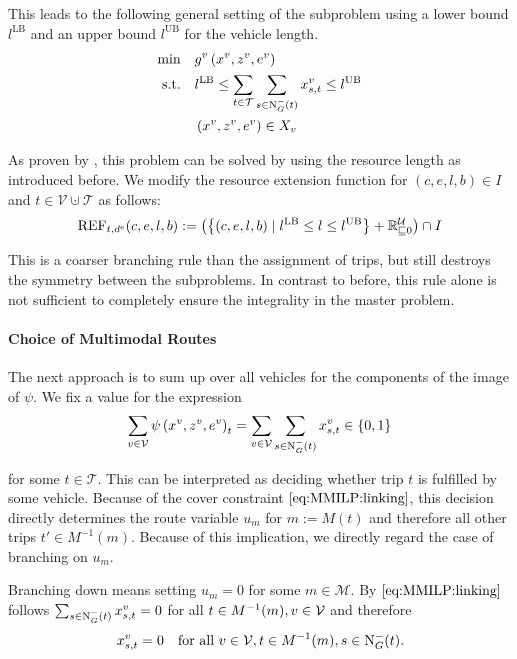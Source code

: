 This leads to the following general setting of the subproblem using a lower bound $l^{\operatorname{LB}}$ and an upper bound $l^{\operatorname{UB}}$ for the vehicle length.
\begin{align}
	\min \quad & g^v\left(x^v,z^v,e^v\right) \nonumber \\
	\text{s.t.} \quad & l^{\operatorname{LB}} \leq \sum_{t\in\mathcal{T}} \sum_{s\in\operatorname{N}_G^-(t)} x^v_{s,t} \leq l^{\operatorname{UB}} \label{eq:SPv:duty_length} \\
	& \left(x^v,z^v,e^v\right)\in X_v \nonumber
\end{align}

As proven by \cite{Kaiser}, this problem can be solved by using the resource length as introduced before. We modify the resource extension function for $(c,e,l,b)\in I$ and ${t\in\mathcal{V}\cupdot\mathcal{T}}$ as follows:
\begin{align*}
	\operatorname{REF}_{t,d^{\operatorname{e}}}(c,e,l,b) := \left(\left\{(c,e,l,b)\mid l^{\operatorname{LB}}\leq l \leq l^{\operatorname{UB}}\right\} + \mathbb{R}^{\mathcal{U}}_{\sqsubseteq 0}\right) \cap I
\end{align*}

This is a coarser branching rule than the assignment of trips, but still destroys the symmetry between the subproblems. In contrast to before, this rule alone is not sufficient to completely ensure the integrality in the master problem.

\paragraph{Choice of Multimodal Routes} \parfill

The next approach is to sum up over all vehicles for the components of the image of $\psi$. We fix a value for the expression
\begin{align*}
	\sum_{v\in\mathcal{V}}\psi\left(x^v,z^v,e^v\right)_t = \sum_{v\in\mathcal{V}} \sum_{s\in\operatorname{N}_G^-(t)} x^v_{s,t} \in\left\{0,1\right\}
\end{align*}

for some $t\in\mathcal{T}$. This can be interpreted as deciding whether trip $t$ is fulfilled by some vehicle. Because of the cover constraint $\eqref{eq:MMILP:linking}$, this decision directly determines the route variable $u_m$ for ${m := M(t)}$ and therefore all other trips ${t'\in M^{-1}(m)}$. Because of this implication, we directly regard the case of branching on $u_m$.

Branching down means setting ${u_m = 0}$ for some ${m\in\mathcal{M}}$. By $\eqref{eq:MMILP:linking}$ follows\linebreak
${\sum_{s\in\operatorname{N}_G^-(t)}x_{s,t}^v = 0}$ for all ${t\in M^{-1}(m)}, v\in\mathcal{V}$ and therefore
\begin{align*}
	x^v_{s,t} = 0 && \text{for all } v\in\mathcal{V}, t\in M^{-1}(m), s\in\operatorname{N}_G^-(t).
\end{align*}

